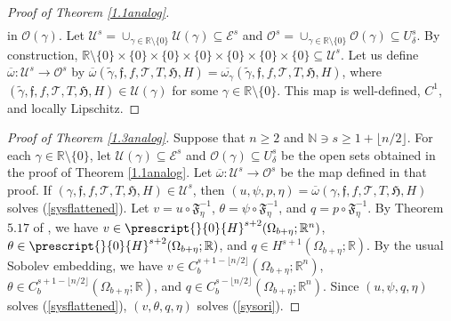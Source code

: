 \documentclass[11pt,letterpaper,reqno]{amsart}
\numberwithin{equation}{section}
\begin{document}
\begin{proof}[Proof of Theorem \ref{1.1analog}]
\begin{align}
 \end{align}
 in \(\mathcal{O}(\gamma)\). Let \(\mathcal{U}^{s}=\cup_{\gamma \in \mathbb{R} \setminus \{0\}}\mathcal{U}(\gamma)\subseteq \mathcal{E}^{s}\) and \(\mathcal{O}^{s}=\cup_{\gamma \in \mathbb{R} \setminus \{0\}}\mathcal{O}(\gamma) \subseteq U_{\delta}^{s}\). By construction, \(\mathbb{R} \setminus \{0\} \times \{0\} \times\{0\} \times\{0\} \times\{0\} \times\{0\} \times\{0\} \subseteq \mathcal{U}^{s}\). Let us define \(\overline{\omega}:\mathcal{U}^{s} \to \mathcal{O}^{s}\) by \(\overline{\omega}(\widetilde{\gamma},\mathfrak{f},f, \mathcal{T},T,\mathfrak{H},H)=\overline{\omega_{\gamma}}(\widetilde{\gamma},\mathfrak{f},f, \mathcal{T},T,\mathfrak{H},H)\), where \((\widetilde{\gamma},\mathfrak{f},f, \mathcal{T},T,\mathfrak{H},H) \in \mathcal{U}(\gamma)\) for some \(\gamma \in \mathbb{R} \setminus \{0\}\). This map is well-defined, \(C^{1}\), and locally Lipschitz.
\end{proof}

\begin{proof}[Proof of Theorem \ref{1.3analog}]
    Suppose that \(n \geq 2\) and \(\mathbb{N} \ni s \geq 1+ \lfloor n/2 \rfloor\). For each  \(\gamma \in \mathbb{R} \setminus \{0\}\), let \(\mathcal{U}(\gamma) \subseteq \mathcal{E}^{s}\) and \(\mathcal{O}(\gamma) \subseteq U_{\delta}^{s}\) be the open sets obtained in the proof of Theorem \ref{1.1analog}. Let \(\overline{\omega}:\mathcal{U}^{s} \to \mathcal{O}^{s}\) be the map defined in that proof. If \((\gamma,\mathfrak{f},f, \mathcal{T},T,\mathfrak{H},H) \in \mathcal{U}^{s}\), then \((u,\psi,p,\eta) =\overline{\omega}(\gamma,\mathfrak{f},f, \mathcal{T},T,\mathfrak{H},H)\) solves (\ref{sysflattened}). Let \(v=u \circ \mathfrak{F}_{\eta}^{-1}\), \(\theta=\psi \circ \mathfrak{F}_{\eta}^{-1}\), and \(q=p \circ \mathfrak{F}_{\eta}^{-1}\). By Theorem \(5.17\) of \cite{leoni2023traveling}, we have \(v\in \prescript{}{0}{H}^{s+2}(\Omega_{b+\eta};\mathbb{R}^{n})\), \(\theta\in \prescript{}{0}{H}^{s+2}(\Omega_{b+\eta};\mathbb{R})\), and \(q \in H^{s+1}(\Omega_{b+\eta};\mathbb{R})\). By the usual Sobolev embedding, we have \(v \in C_{b}^{s+1-\lfloor n/2\rfloor}(\Omega_{b+\eta};\mathbb{R}^{n})\), \(\theta \in C_{b}^{s+1-\lfloor n/2\rfloor}(\Omega_{b+\eta};\mathbb{R})\), and \(q \in C_{b}^{s-\lfloor n/2 \rfloor}(\Omega_{b+\eta};\mathbb{R}^{n})\). Since \((u,\psi,q,\eta)\) solves (\ref{sysflattened}), \((v,\theta,q,\eta)\) solves (\ref{sysori}).
\end{proof}


 
 





 


\end{document}

